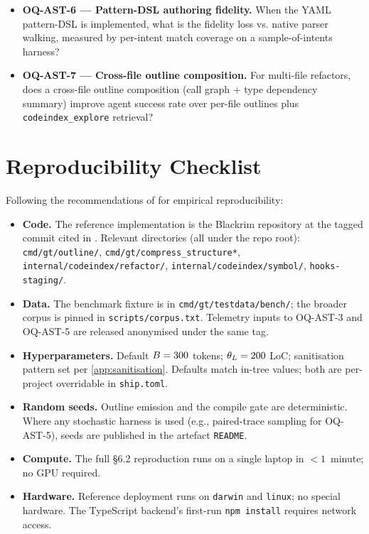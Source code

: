 \begin{itemize}[leftmargin=*]
        Blocker: paired-trace dataset across $N_\text{task} \geq 50$
        tasks; requires discipline to be running in production for
        at least one Explore-tier project long enough to accumulate
        traces (\texttt{.beads/telemetry/invocations.jsonl}).
  \item \textbf{OQ-AST-6 — Pattern-DSL authoring fidelity.} When
        the YAML pattern-DSL is implemented, what is the fidelity
        loss vs. native parser walking, measured by per-intent
        match coverage on a sample-of-intents harness?
  \item \textbf{OQ-AST-7 — Cross-file outline composition.} For
        multi-file refactors, does a cross-file outline composition
        (call graph + type dependency summary) improve agent
        success rate over per-file outlines plus
        \texttt{codeindex\_explore} retrieval?
\end{itemize}

\section{Reproducibility Checklist}
\label{app:repro}

Following the recommendations of \cite{pineau2021improving} for
empirical reproducibility:

\begin{itemize}[leftmargin=*]
  \item \textbf{Code.} The reference implementation is the Blackrim
        repository at the tagged commit cited in
        \cite{blackrim_paper_repo}. Relevant directories (all under
        the repo root): \texttt{cmd/gt/outline/},
        \texttt{cmd/gt/compress\_structure*},
        \texttt{internal/codeindex/refactor/},
        \texttt{internal/codeindex/symbol/}, \texttt{hooks-staging/}.
  \item \textbf{Data.} The benchmark fixture is in
        \texttt{cmd/gt/testdata/bench/}; the broader corpus is pinned
        in \texttt{scripts/corpus.txt}. Telemetry inputs to OQ-AST-3
        and OQ-AST-5 are released anonymised under the same tag.
  \item \textbf{Hyperparameters.} Default $B = 300$ tokens;
        $\theta_{L} = 200$ LoC; sanitisation pattern set per
        \cref{app:sanitisation}. Defaults match in-tree values; both
        are per-project overridable in \texttt{ship.toml}.
  \item \textbf{Random seeds.} Outline emission and the compile gate
        are deterministic. Where any stochastic harness is used
        (e.g., paired-trace sampling for OQ-AST-5), seeds are
        published in the artefact \texttt{README}.
  \item \textbf{Compute.} The full §6.2 reproduction runs on a
        single laptop in $< 1$~minute; no GPU required.
  \item \textbf{Hardware.} Reference deployment runs on
        \texttt{darwin} and \texttt{linux}; no special hardware. The
        TypeScript backend's first-run \texttt{npm install} requires
        network access.
\end{itemize}
